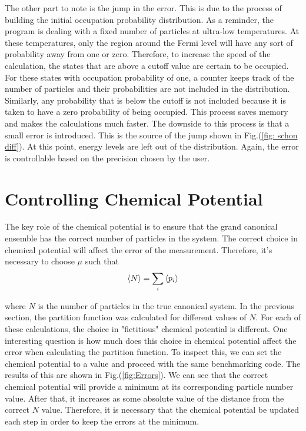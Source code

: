 The other part to note is the jump in the error. This is due to the process of building the initial occupation probability distribution. As a reminder, the program is dealing with a fixed number of particles at ultra-low temperatures. At these temperatures, only the region around the Fermi level will have any sort of probability away from one or zero. Therefore, to increase the speed of the calculation, the states that are above a cutoff value are certain to be occupied. For these states with occupation probability of one, a counter keeps track of the number of particles and their probabilities are not included in the distribution. Similarly, any probability that is below the cutoff is not included because it is taken to have a zero probability of being occupied. This process saves memory and makes the calculations much faster. The downside to this process is that a small error is introduced. This is the source of the jump shown in Fig.\@ (\ref{fig: schon diff}). At this point, energy levels are left out of the distribution. Again, the error is controllable based on the precision chosen by the user.

\section{Controlling Chemical Potential}
The key role of the chemical potential is to ensure that the grand canonical ensemble has the correct number of particles in the system. The correct choice in chemical potential will affect the error of the measurement. Therefore, it's necessary to choose $\mu$ such that 
\begin{equation}
    \left<{N}\right>=\sum_i \left<{p_i}\right>
\end{equation}

where $N$ is the number of particles in the true canonical system. In the previous section, the partition function was calculated for different values of $N$. For each of these calculations, the choice in "fictitious" chemical potential is different. One interesting question is how much does this choice in chemical potential affect the error when calculating the partition function. To inspect this, we can set the chemical potential to a value and proceed with the same benchmarking code. The results of this are shown in Fig.\@ (\ref{fig:Errors}). We can see that the correct chemical potential will provide a minimum at its corresponding particle number value. After that, it increases as some absolute value of the distance from the correct $N$ value. Therefore, it is necessary that the chemical potential be updated each step in order to keep the errors at the minimum. 

